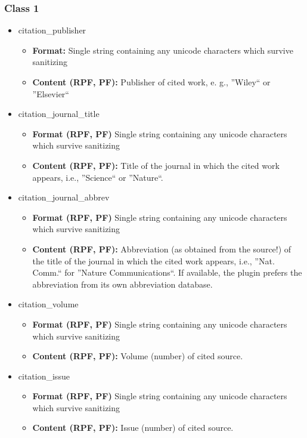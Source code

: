 \documentclass[
a4paper,
12pt,
]
{article}
\begin{document}
 \subsubsection{Class 1}
 \begin{itemize}
    \item citation\_publisher \begin{itemize} \item \textbf{Format:} Single string containing any unicode characters which survive sanitizing \item \textbf{Content (RPF, PF):} Publisher of cited work, e. g., ''Wiley`` or ''Elsevier`` \end{itemize}
   \item citation\_journal\_title \begin{itemize} \item \textbf{Format (RPF, PF)} Single string containing any unicode characters which survive sanitizing \item \textbf{Content (RPF, PF):} Title of the journal in which the cited work appears, i.e., ''Science`` or ''Nature``. \end{itemize}
   \item citation\_journal\_abbrev \begin{itemize} \item \textbf{Format (RPF, PF)} Single string containing any unicode characters which survive sanitizing \item \textbf{Content (RPF, PF):} 
   Abbreviation (as obtained from the source!) of the title of the journal in which the cited work appears, i.e., ''Nat. Comm.`` for ''Nature Communications``. If available, the plugin prefers the abbreviation from its own abbreviation database.\end{itemize}
   \item citation\_volume \begin{itemize} \item \textbf{Format (RPF, PF)} Single string containing any unicode characters which survive sanitizing \item \textbf{Content (RPF, PF):} Volume (number) of cited source. \end{itemize}
   \item citation\_issue \begin{itemize} \item \textbf{Format (RPF, PF)} Single string containing any unicode characters which survive sanitizing \item \textbf{Content (RPF, PF):} Issue (number) of cited source. \end{itemize}

\end{itemize}
\end{document}
